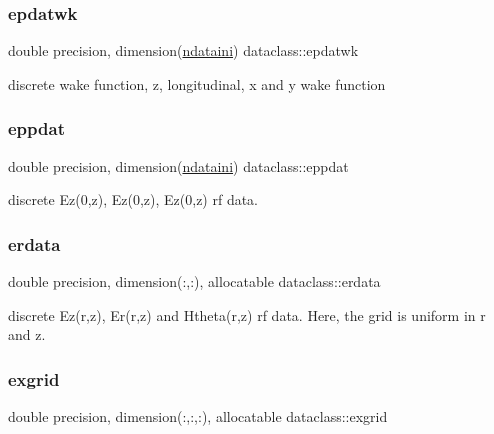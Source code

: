 \subsubsection{\texorpdfstring{epdatwk}{epdatwk}}
{\footnotesize\ttfamily double precision, dimension(\mbox{\hyperlink{namespacedataclass_a2578bbe9c4dc0892ee08a8619cd7e978}{ndataini}}) dataclass\+::epdatwk}



discrete wake function, z, longitudinal, x and y wake function 

\mbox{\label{namespacedataclass_a1c9d30100962693c922470368987ec8a}} 
\subsubsection{\texorpdfstring{eppdat}{eppdat}}
{\footnotesize\ttfamily double precision, dimension(\mbox{\hyperlink{namespacedataclass_a2578bbe9c4dc0892ee08a8619cd7e978}{ndataini}}) dataclass\+::eppdat}



discrete Ez(0,z), Ez\textquotesingle{}(0,z), Ez\textquotesingle{}\textquotesingle{}(0,z) rf data. 

\mbox{\label{namespacedataclass_a4f3abc6db52a89363b184d4bec9ebff8}} 
\subsubsection{\texorpdfstring{erdata}{erdata}}
{\footnotesize\ttfamily double precision, dimension(\+:,\+:), allocatable dataclass\+::erdata}



discrete Ez(r,z), Er(r,z) and Htheta(r,z) rf data. Here, the grid is uniform in r and z. 

\mbox{\label{namespacedataclass_a3379b2d98107a6908aabb71e53031c00}} 
\subsubsection{\texorpdfstring{exgrid}{exgrid}}
{\footnotesize\ttfamily double precision, dimension(\+:,\+:,\+:), allocatable dataclass\+::exgrid}



